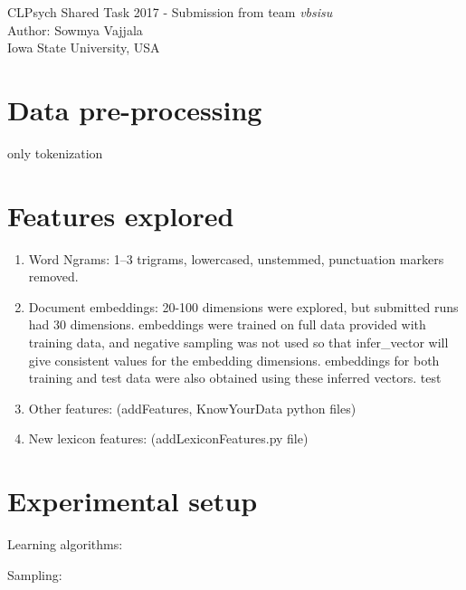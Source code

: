 \documentclass{article}
\begin{document}
CLPsych Shared Task 2017 - Submission from team \textit{vbsisu}
\\  Author: Sowmya Vajjala
\\ Iowa State University, USA

\section{Data pre-processing}
only tokenization

\section{Features explored}

\begin{enumerate}
\item Word Ngrams: 1--3 trigrams, lowercased, unstemmed, punctuation markers removed.
\item Document embeddings: 20-100 dimensions were explored, but submitted runs had 30 dimensions. 
embeddings were trained on full data provided with training data, and negative sampling was not used so that infer\_vector will give consistent values for the embedding dimensions. 
embeddings for both training and test data were also obtained using these inferred vectors. test

\item Other features: (addFeatures, KnowYourData python files)

\item New lexicon features: (addLexiconFeatures.py file)
\end{enumerate}

\section{Experimental setup}
Learning algorithms:

Sampling:
\end{document}
